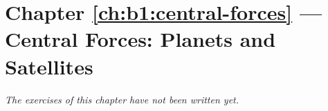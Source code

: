 \section*{Chapter \ref{ch:b1:central-forces} --- Central Forces: Planets and Satellites}


\emph{The exercises of this chapter have not been written yet.}
